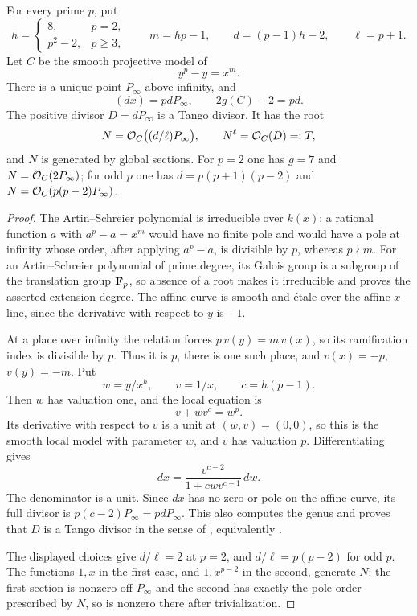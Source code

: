 \begin{lemma}
\label{lem:OC-generated-Tango-root}
For every prime $p$, put
\[
 h=\begin{cases}8,&p=2,\\p^2-2,&p\geq3,\end{cases}
 \qquad m=hp-1,\qquad d=(p-1)h-2,\qquad \ell=p+1.
\]
Let $C$ be the smooth projective model of
\[
                        y^p-y=x^m.
\]
There is a unique point $P_\infty$ above infinity, and
\[
 (dx)=pdP_\infty,\qquad 2g(C)-2=pd.
\]
The positive divisor $D=dP_\infty$ is a Tango divisor.  It has the root
\[
 N=\mathcal O_C\bigl((d/\ell)P_\infty\bigr),\qquad
 N^\ell=\mathcal O_C(D)=:T,
\]
and $N$ is generated by global sections.  For $p=2$ one has
$g=7$ and $N=\mathcal O_C(2P_\infty)$; for odd $p$ one has
$d=p(p+1)(p-2)$ and $N=\mathcal O_C(p(p-2)P_\infty)$.
\end{lemma}
\begin{proof}
The Artin--Schreier polynomial is irreducible over $k(x)$: a rational function $a$ with $a^p-a=x^m$ would have no finite pole and would have a pole at infinity whose order, after applying $a^p-a$, is divisible by $p$, whereas $p\nmid m$.  For an Artin--Schreier polynomial of prime degree, its Galois group is a subgroup of the translation group $\mathbf F_p$, so absence of a root makes it irreducible and proves the asserted extension degree.  The affine curve is smooth and \'etale over the affine $x$-line, since the derivative with respect to $y$ is $-1$.

At a place over infinity the relation forces $p\,v(y)=m\,v(x)$, so its ramification index is divisible by $p$.  Thus it is $p$, there is one such place, and
$v(x)=-p$, $v(y)=-m$.  Put
\[
                    w=y/x^h,\qquad v=1/x,\qquad c=h(p-1).
\]
Then $w$ has valuation one, and the local equation is
\[
                         v+w v^c=w^p.
\]
Its derivative with respect to $v$ is a unit at $(w,v)=(0,0)$, so this is the smooth local model with parameter $w$, and $v$ has valuation $p$.  Differentiating gives
\[
             dx=\frac{v^{c-2}}{1+cw v^{c-1}}\,dw.
\]
The denominator is a unit.  Since $dx$ has no zero or pole on the affine curve, its full divisor is $p(c-2)P_\infty=pdP_\infty$.  This also computes the genus and proves that $D$ is a Tango divisor in the sense of \cite[Definition~2.1]{Zheng2017Kodaira}, equivalently \cite[Theorem~1.2]{Mukai2011Kodaira}.

The displayed choices give $d/\ell=2$ at $p=2$, and $d/\ell=p(p-2)$ for odd $p$.  The functions $1,x$ in the first case, and $1,x^{p-2}$ in the second, generate $N$: the first section is nonzero off $P_\infty$ and the second has exactly the pole order prescribed by $N$, so is nonzero there after trivialization.
\end{proof}

